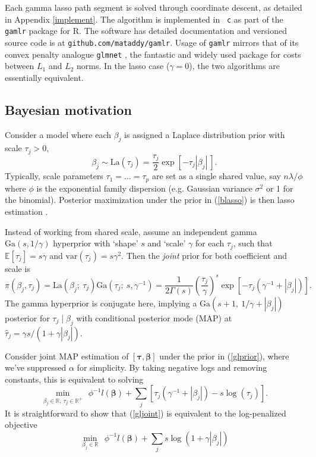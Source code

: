 \documentclass[twoside]{article}
\newcommand{\bs}[1]{\boldsymbol{#1}}
\newcommand{\mr}[1]{\mathrm{#1}}
\newcommand{\ds}[1]{\mathds{#1}}
\begin{document}
Each  gamma lasso path segment is solved through coordinate descent,
as detailed in Appendix \ref{implement}.  The algorithm is implemented in {\tt
c} as part of the {\tt gamlr} package for {\sf R}. The software  has detailed documentation and versioned source code is at
{\tt github.com/mataddy/gamlr}.  Usage of {\tt gamlr} mirrors that of its
convex penalty analogue {\tt glmnet} \citep{friedman_regularization_2010}, the
fantastic and widely used package for costs between $L_1$ and $L_2$ norms. In
the lasso case ($\gamma=0$), the two algorithms are essentially equivalent.


\subsection{Bayesian motivation}

Consider a model where each $\beta_j$ is
assigned a Laplace distribution prior with scale $\tau_j>0$,
\begin{equation}\label{blasso}
\beta_j \sim \mr{La}\left(\tau_j\right) =
\frac{\tau_j}{2}\exp\left[ -\tau_j|\beta_j| ~\right].
\end{equation}
Typically, scale parameters $\tau_1 =
\ldots = \tau_p$ are set as a single shared value, say $n\lambda/\phi$ where
 $\phi$ is the exponential family dispersion (e.g. Gaussian variance
$\sigma^2$ or 1 for the binomial).   Posterior
maximization under the prior in (\ref{blasso}) is then lasso estimation \citep[e.g.,][]{park_bayesian_2008}.

Instead of working from shared scale, assume an independent gamma
$\mr{Ga}(s,1/\gamma)$ hyperprior with `shape' $s$ and `scale' $\gamma$ for
each $\tau_j$, such that $\ds{E}[\tau_j] = s\gamma$ and $\mr{var}(\tau_j) =
s\gamma^2$.  Then the {\it joint} prior for both coefficient and scale is
\begin{equation}\label{glprior}
\pi(\beta_j,\tau_j) = \mr{La}\left(\beta_j ;~ \tau_j\right)
\mr{Ga}\left(\tau_j;~ s,\gamma^{-1}\right) = \frac{ 1}{2\Gamma({s})} 
\left(\frac{\tau_j}{\gamma}\right)^{s}
               \exp\left[-\tau_j(\gamma^{-1}+|\beta_j|)\right].
\end{equation}
The gamma hyperprior is conjugate here, implying a $\mr{Ga}\left(s+1, ~1/\gamma +
|\beta_j|\right)$ posterior for $\tau_j \mid \beta_j$ with conditional
posterior mode (MAP) at $\hat\tau_j = \gamma s/(1 + \gamma |\beta_j|)$.

Consider joint MAP estimation of $[\bs{\tau},\bs{\beta}]$ under the prior in
   (\ref{glprior}), where we've suppressed $\alpha$ for simplicity. By taking
   negative logs and removing constants, this is equivalent to solving
\begin{equation}\label{gljoint}
\min_{\beta_j\in\ds{R},~\tau_j \in \ds{R}^{+}}~~
\phi^{-1}l(\bs{\beta}) + \sum_j \left[\tau_j(\gamma^{-1}+|\beta_j|) - s\log(\tau_j)\right].
\end{equation}
It is straightforward to show that (\ref{gljoint}) is equivalent 
to the log-penalized objective 
\begin{equation}\label{logobj}
\min_{\beta_j\in\ds{R}}~~
\phi^{-1}l(\bs{\beta}) + \sum_j  s\log(1+\gamma|\beta_j|)
\end{equation}
\end{document}
